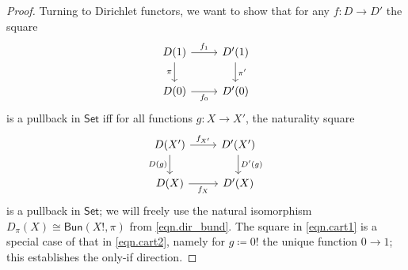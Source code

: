 \documentclass[11pt, article, one side]{memoir}
\theoremstyle{theorem}
\theoremstyle{definition}
\theoremstyle{remark}
\newcommand{\Cat}[1]{\mathsf{#1}}%
\newcommand{\smset}{\Cat{Set}}
\newcommand{\bun}{\Cat{Bun}}
\begin{document}
\begin{proof}
Turning to Dirichlet functors, we want to show that for any $f\colon D\to D'$ the square
\begin{equation}\label{eqn.cart1}
\begin{tikzcd}
	D(1)\ar[r, "f_1"]\ar[d, "\pi"']&
	D'(1)\ar[d, "\pi'"]\\
	D(0)\ar[r, "f_0"']&
	D'(0)
\end{tikzcd}
\end{equation}
is a pullback in $\smset$ iff for all functions $g\colon X\to X'$, the naturality square
\begin{equation}\label{eqn.cart2}
\begin{tikzcd}
  D(X')\ar[r, "f_{X'}"]\ar[d, "D(g)"']&
  D'(X')\ar[d, "D'(g)"]\\
  D(X)\ar[r, "f_X"']&
  D'(X)
\end{tikzcd}
\end{equation}
is a pullback in $\smset$; we will freely use the natural isomorphism $D_\pi(X)\cong\bun(X!,\pi)$ from \cref{eqn.dir_bund}. The square in \cref{eqn.cart1} is a special case of that in \cref{eqn.cart2}, namely for $g\coloneqq 0!$ the unique function $0\to 1$; this establishes the only-if direction.


\end{proof}
\end{document}
